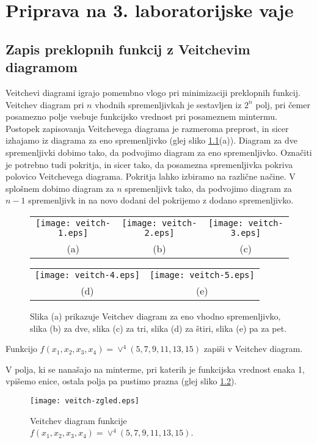 \chapter{Priprava na 3. laboratorijske vaje}

\section{Zapis preklopnih funkcij z Veitchevim diagramom}

Veitchevi diagrami igrajo pomembno vlogo pri minimizaciji preklopnih funkcij. Veitchev diagram pri $n$ vhodnih spremenljivkah je sestavljen iz $2^n$ polj, pri čemer posamezno polje vsebuje funkcijsko vrednost pri posameznem mintermu. Postopek zapisovanja Veitchevega diagrama je razmeroma preprost, in sicer izhajamo iz diagrama za eno spremenljivko (glej sliko \ref{fig:Veitch}(a)). Diagram za dve spremenljivki dobimo tako, da podvojimo diagram za eno spremenljivko. Označiti je potrebno tudi pokritja, in sicer tako, da posamezna spremenljivka pokriva polovico Veitchevega diagrama. Pokritja lahko izbiramo na različne načine. V splošnem dobimo diagram za $n$ spremenljivk tako, da podvojimo diagram za $n-1$ spremenljivk in na novo dodani del pokrijemo z dodano spremenljivko.

\begin{figure}[ht]
\begin{center}
	\begin{tabular}{ccc}
		\texttt{[image: veitch-1.eps]} & \texttt{[image: veitch-2.eps]} & \texttt{[image: veitch-3.eps]}\\
		(a) & (b) & (c)\\
	\end{tabular}		
	\begin{tabular}{cc}
		\texttt{[image: veitch-4.eps]} & \texttt{[image: veitch-5.eps]}\\
		(d) & (e)\\
	\end{tabular}	
	
\end{center}
\caption{Slika (a) prikazuje Veitchev diagram za eno vhodno spremenljivko, slika (b) za dve, slika (c) za tri, slika (d) za štiri, slika (e) pa za pet.}
\label{fig:Veitch}
\end{figure}

\begin{zgled}
Funkcijo $f(x_1,x_2,x_3,x_4) = \vee^4(5, 7, 9, 11, 13, 15)$ zapiši v Veitchev diagram. 
\end{zgled}
\begin{resitev}
V polja, ki se nanašajo na minterme, pri katerih je funkcijska vrednost enaka 1, vpišemo enice, ostala polja pa pustimo prazna (glej sliko \ref{fig:Veitch-zgled}).

\begin{figure}[ht]
\begin{center}
	\texttt{[image: veitch-zgled.eps]} 
\end{center}
\caption{Veitchev diagram funkcije $f(x_1,x_2,x_3,x_4) = \vee^4(5, 7, 9, 11, 13, 15)$.}
\label{fig:Veitch-zgled}
\end{figure}

\end{resitev}

